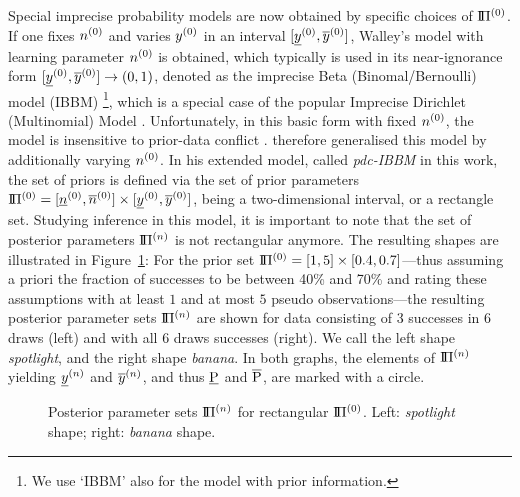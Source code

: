 Special imprecise probability models are now obtained by specific
choices of $\PZ$. If one fixes $n^{(0)}$ and varies $y^{(0)}$ in an interval $[\underline{y}^{(0)},\overline{y}^{(0)}]$,
Walley's \parencite*[\S 5.3]{1991:walley} model with learning parameter $n^{(0)}$ is obtained, which typically
is used in its near-ignorance form $[\underline{y}^{(0)}, \overline{y}^{(0)}] \to (0,1)$,
denoted as the imprecise Beta (Binomal/Bernoulli) model (IBBM)%
\footnote{We use `IBBM' also for the model with prior information.},
which is a special case of the popular Imprecise Dirichlet (Multinomial) Model
\parencite{1996:walley::idm,1999:walleybernard}. Unfortunately, in this basic form with fixed $n^{(0)}$, the model is
insensitive to prior-data conflict \parencite[p.~263, see Section~\ref{section:fixednschlecht}]{Walter2009a}.
\textcite[\S 5.4]{1991:walley} therefore generalised this
model by additionally varying $n^{(0)}$. In his extended model,
called \emph{pdc-IBBM} in this work, the set of priors is defined via the
set of prior parameters $\text{I}\!\Pi^{(0)} = [\underline{n}^{(0)}, \overline{n}^{(0)}] \times [\underline{y}^{(0)}, \overline{y}^{(0)}]$,
being a two-dimensional interval, or a rectangle set.
Studying inference in this model, it is important to note that the set of posterior parameters
$\PN$ is not rectangular anymore. The resulting shapes are illustrated in Figure~\ref{fig:spot-banana}: For the
prior set $\text{I}\!\Pi^{(0)} = [1, 5 ] \times  [0.4, 0.7]$---thus assuming a priori the
fraction of successes to be between 40\% and 70\% and rating these assumptions
with at least $1$ and at most $5$ pseudo observations---the resulting posterior parameter sets $\PN$
are shown for data consisting of 3 successes in 6 draws (left) and with all 6 draws successes (right).
We call the left shape \emph{spotlight}, and the right shape
\emph{banana}. In both graphs, the elements of $\PN$ yielding
$\underline{y}^{(n)}$ and $\overline{y}^{(n)}$, and thus $\underline{\operatorname{P}}$ and $\overline{\operatorname{P}}$,
are marked with a circle.

\begin{figure}%
\caption[Posterior parameter sets $\PN$ for rectangular $\PZ$.]%
{Posterior parameter sets $\PN$ for rectangular $\PZ$. Left: \emph{spotlight} shape; right: \emph{banana} shape.}
\label{fig:spot-banana}
\end{figure}

